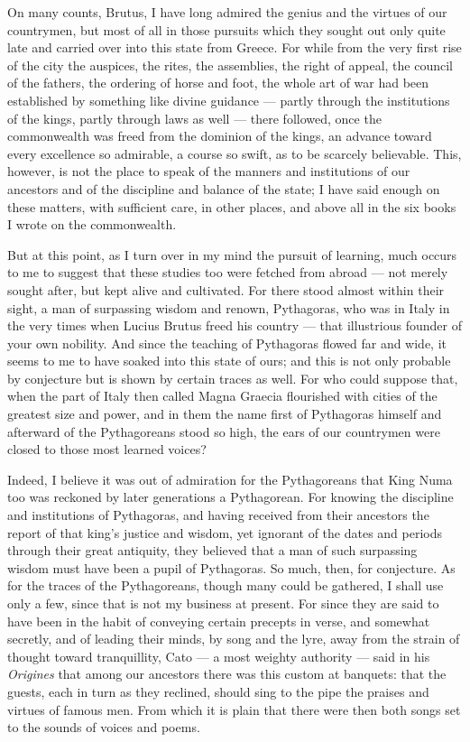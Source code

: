  On many counts, Brutus, I have long admired the genius and the virtues of our countrymen, but most of all in those pursuits which they sought out only quite late and carried over into this state from Greece. For while from the very first rise of the city the auspices, the rites, the assemblies, the right of appeal, the council of the fathers, the ordering of horse and foot, the whole art of war had been established by something like divine guidance — partly through the institutions of the kings, partly through laws as well — there followed, once the commonwealth was freed from the dominion of the kings, an advance toward every excellence so admirable, a course so swift, as to be scarcely believable. This, however, is not the place to speak of the manners and institutions of our ancestors and of the discipline and balance of the state; I have said enough on these matters, with sufficient care, in other places, and above all in the six books I wrote on the commonwealth.

 But at this point, as I turn over in my mind the pursuit of learning, much occurs to me to suggest that these studies too were fetched from abroad — not merely sought after, but kept alive and cultivated. For there stood almost within their sight, a man of surpassing wisdom and renown, Pythagoras, who was in Italy in the very times when Lucius Brutus freed his country — that illustrious founder of your own nobility. And since the teaching of Pythagoras flowed far and wide, it seems to me to have soaked into this state of ours; and this is not only probable by conjecture but is shown by certain traces as well. For who could suppose that, when the part of Italy then called Magna Graecia flourished with cities of the greatest size and power, and in them the name first of Pythagoras himself and afterward of the Pythagoreans stood so high, the ears of our countrymen were closed to those most learned voices?

 Indeed, I believe it was out of admiration for the Pythagoreans that King Numa too was reckoned by later generations a Pythagorean. For knowing the discipline and institutions of Pythagoras, and having received from their ancestors the report of that king's justice and wisdom, yet ignorant of the dates and periods through their great antiquity, they believed that a man of such surpassing wisdom must have been a pupil of Pythagoras. So much, then, for conjecture. As for the traces of the Pythagoreans, though many could be gathered, I shall use only a few, since that is not my business at present. For since they are said to have been in the habit of conveying certain precepts in verse, and somewhat secretly, and of leading their minds, by song and the lyre, away from the strain of thought toward tranquillity, Cato — a most weighty authority — said in his \textit{Origines} that among our ancestors there was this custom at banquets: that the guests, each in turn as they reclined, should sing to the pipe the praises and virtues of famous men. From which it is plain that there were then both songs set to the sounds of voices and poems.

